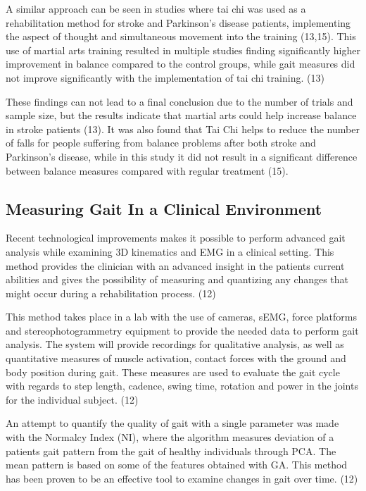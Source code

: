 A similar approach can be seen in studies where tai chi was used as a rehabilitation method for stroke and Parkinson's disease patients, implementing the aspect of thought and simultaneous movement into the training (13,15). This use of martial arts training resulted in multiple studies finding significantly higher improvement in balance compared to the control groups, while gait measures did not improve significantly with the implementation of tai chi training. (13)

These findings can not lead to a final conclusion due to the number of trials and sample size, but the results indicate that martial arts could help increase balance in stroke patients (13). It was also found that Tai Chi helps to reduce the number of falls for people suffering from balance problems after both stroke and Parkinson's disease, while in this study it did not result in a significant difference between balance measures compared with regular treatment (15).

\subsection{Measuring Gait In a Clinical Environment}

Recent technological improvements makes it possible to perform advanced gait analysis while examining 3D kinematics and EMG in a clinical setting. This method provides the clinician with an advanced insight in the patients current abilities and gives the possibility of measuring and quantizing any changes that might occur during a rehabilitation process. (12)

This method takes place in a lab with the use of cameras, sEMG, force platforms and stereophotogrammetry equipment to provide the needed data to perform gait analysis. The system will provide recordings for qualitative analysis, as well as quantitative measures of muscle activation, contact forces with the ground and body position during gait. These measures are used to evaluate the gait cycle with regards to step length, cadence, swing time, rotation and power in the joints for the individual subject. (12)

An attempt to quantify the quality of gait with a single parameter was made with the Normalcy Index (NI), where the algorithm measures deviation of a patients gait pattern from the gait of healthy individuals through PCA. The mean pattern is based on some of the features obtained with GA. This method has been proven to be an effective tool to examine changes in gait over time. (12)

